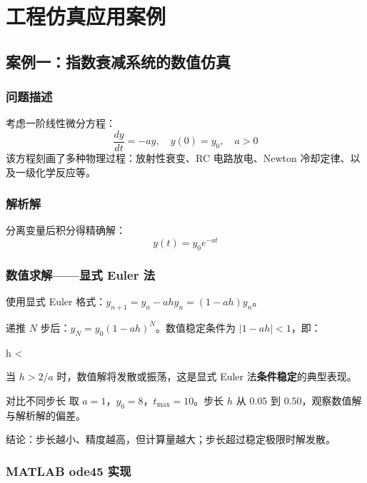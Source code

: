 \chapter{工程仿真应用案例}


\section{案例一：指数衰减系统的数值仿真}

\subsection{问题描述}

考虑一阶线性微分方程：
\[
\frac{dy}{dt} = -a y, \quad y(0) = y_0, \quad a > 0
\]
该方程刻画了多种物理过程：放射性衰变、RC 电路放电、Newton 冷却定律、以及一级化学反应等。

\subsection{解析解}

分离变量后积分得精确解：
\[
y(t) = y_0 e^{-a t}
\]

\subsection{数值求解——显式 Euler 法}

使用显式 Euler 格式：$y_{n+1} = y_n - a h y_n = (1 - ah) y_n$。

递推 $N$ 步后：$y_N = y_0 (1 - ah)^N$。数值稳定条件为 $|1 - ah| < 1$，即：
\begin{myformula}
	h < 
\end{myformula}

当 $h > 2/a$ 时，数值解将发散或振荡，这是显式 Euler 法\textbf{条件稳定}的典型表现。

\begin{example}{对比不同步长}
	取 $a = 1$，$y_0 = 8$，$t_{\max}= 10$。步长 $h$ 从 $0.05$ 到 $0.50$，观察数值解与解析解的偏差。
	
	结论：步长越小、精度越高，但计算量越大；步长超过稳定极限时解发散。
\end{example}

\subsection{MATLAB ode45 实现}

